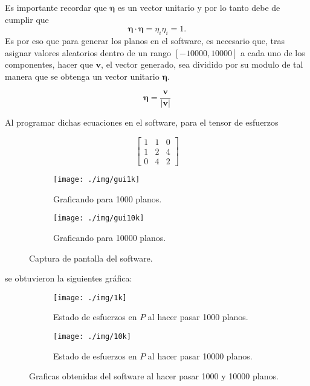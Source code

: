 \documentclass{article}
\begin{document}
    Es importante recordar que $\bm{\eta}$ es un vector unitario y por lo tanto debe de cumplir que
    \begin{equation}
        \bm{\eta}\cdot\bm{\eta} = \eta_{i}\eta_{i} = 1.
    \end{equation}
    Es por eso que para generar los planos en el software, es necesario que, tras asignar valores aleatorios
    dentro de un rango $[-10000, 10000]$ a cada uno de los componentes, hacer que $\bm{v}$, 
    el vector generado, sea dividido por su modulo de tal manera que se obtenga un vector unitario $\bm{\eta}$.

    \begin{equation}
        \bm{\eta} = \frac{\bm{v}}{\lvert \bm{v} \rvert}
    \end{equation}

    Al programar dichas ecuaciones en el software, para el tensor de esfuerzos

    \begin{equation*}
        \begin{bmatrix}
            1 & 1 & 0 \\
            1 & 2 & 4 \\
            0 & 4 & 2
        \end{bmatrix}
    \end{equation*}

    \begin{figure}[H]
        \centering
        \begin{subfigure}[h!]{0.4\linewidth}
            \texttt{[image: ./img/gui1k]}
            \caption{Graficando para 1000 planos.}
        \end{subfigure}
        \begin{subfigure}[h!]{0.4\linewidth}
            \texttt{[image: ./img/gui10k]}
            \caption{Graficando para 10000 planos.}
        \end{subfigure}
        \caption{Captura de pantalla del software.}
        \label{fig:software}
    \end{figure}

    se obtuvieron la siguientes gr\'{a}fica:

    \begin{figure}[H]
        \centering
        \begin{subfigure}[h!]{0.4\linewidth}
            \texttt{[image: ./img/1k]}
            \caption{Estado de esfuerzos en $P$ al hacer pasar 1000 planos.}
        \end{subfigure}
        \begin{subfigure}[h!]{0.4\linewidth}
            \texttt{[image: ./img/10k]}
            \caption{Estado de esfuerzos en $P$ al hacer pasar 10000 planos.}
        \end{subfigure}
        \caption{Graficas obtenidas del software al hacer pasar 1000 y 10000 planos.}
        \label{fig:graficas}
    \end{figure}
\end{document}
